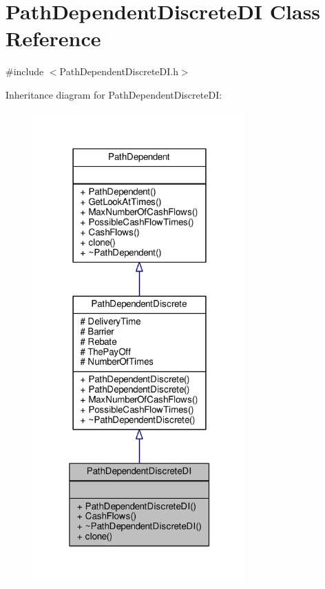 \hypertarget{classPathDependentDiscreteDI}{}\section{Path\+Dependent\+Discrete\+DI Class Reference}
\label{classPathDependentDiscreteDI}


{\ttfamily \#include $<$Path\+Dependent\+Discrete\+D\+I.\+h$>$}



Inheritance diagram for Path\+Dependent\+Discrete\+DI\+:
\nopagebreak
\begin{figure}[H]
\begin{center}
\leavevmode
\includegraphics[width=232pt]{classPathDependentDiscreteDI__inherit__graph}
\end{center}
\end{figure}


